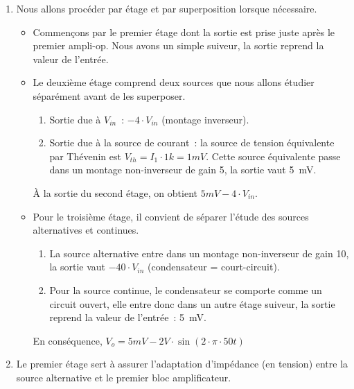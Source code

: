 \documentclass{../template/tp}
\begin{document}
{
	\begin{enumerate}
		\item Nous allons procéder par étage et par superposition lorsque nécessaire.
		\begin{itemize}
			\item Commençons par le premier étage dont la sortie est prise juste après le premier ampli-op.
			Nous avons un simple suiveur, la sortie reprend la valeur de l'entrée.

			\item Le deuxième étage comprend deux sources que nous allons étudier séparément avant de les superposer.
			\begin{enumerate}[label=\alph*)]
				\item Sortie due à $V_{in}$~: $-4 \cdot V_{in}$ (montage inverseur).
				\item Sortie due à la source de courant~: la source de tension équivalente par Thévenin est $V_{th} = I_1 \cdot 1k = 1 mV$.
				Cette source équivalente passe dans un montage non-inverseur de gain 5, la sortie vaut 5~mV.
			\end{enumerate}

			À la sortie du second étage, on obtient $5 mV - 4 \cdot V_{in}$.

			\item Pour le troisième étage, il convient de séparer l'étude des sources alternatives et continues.
			\begin{enumerate}[label=\alph*)]
				\item La source alternative entre dans un montage non-inverseur de gain 10, la sortie vaut $-40 \cdot V_{in}$ (condensateur = court-circuit).
				\item Pour la source continue, le condensateur se comporte comme un circuit ouvert, elle entre donc dans un autre étage suiveur, la sortie reprend la valeur de l'entrée~: 5~mV.
			\end{enumerate}

			En conséquence, $V_o = 5 mV - 2 V \cdot \sin(2\cdot \pi \cdot 50 t)$
		\end{itemize}

		\item Le premier étage sert à assurer l'adaptation d'impédance (en tension) entre la source alternative et le premier bloc amplificateur.
	\end{enumerate}

}
\end{document}
